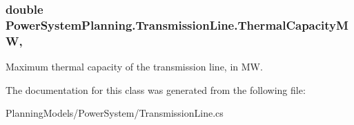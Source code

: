 \subsubsection[{\texorpdfstring{Thermal\+Capacity\+MW}{ThermalCapacityMW}}]{\setlength{\rightskip}{0pt plus 5cm}double Power\+System\+Planning.\+Transmission\+Line.\+Thermal\+Capacity\+MW\hspace{0.3cm}{\ttfamily [get]}, {\ttfamily [set]}}\hypertarget{class_power_system_planning_1_1_transmission_line_a0b11d55d8f8c39bb3f49133f02091f3c}{}\label{class_power_system_planning_1_1_transmission_line_a0b11d55d8f8c39bb3f49133f02091f3c}


Maximum thermal capacity of the transmission line, in MW. 



The documentation for this class was generated from the following file\+:\begin{DoxyCompactItemize}
\item 
Planning\+Models/\+Power\+System/Transmission\+Line.\+cs\end{DoxyCompactItemize}
